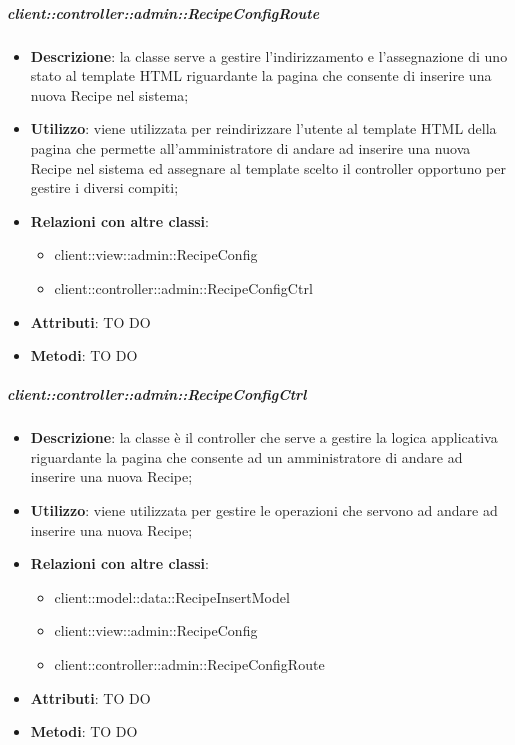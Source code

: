 		\subparagraph{client::controller::admin::RecipeConfigRoute} %
		\label{subp:bdsm_app_client_controller_admin_recipeconfigroute}
			\begin{itemize}
				\item \textbf{Descrizione}: la classe serve a gestire l'indirizzamento e l'assegnazione di uno stato al template HTML riguardante la pagina che consente di inserire una nuova Recipe nel sistema;
				\item \textbf{Utilizzo}: viene utilizzata per reindirizzare l'utente al template HTML della pagina che permette all'amministratore di andare ad inserire una nuova Recipe nel sistema ed assegnare al template scelto il controller opportuno per gestire i diversi compiti;
				\item \textbf{Relazioni con altre classi}:
					\begin{itemize}
						\item client::view::admin::RecipeConfig
						\item client::controller::admin::RecipeConfigCtrl
					\end{itemize}
				\item \textbf{Attributi}: TO DO
				\item \textbf{Metodi}: TO DO
			\end{itemize}

		\subparagraph{client::controller::admin::RecipeConfigCtrl} %
		\label{subp:bdsm_app_client_controller_admin_recipeconfigctrl}
			\begin{itemize}
				\item \textbf{Descrizione}: la classe è il controller che serve a gestire la logica applicativa riguardante la pagina che consente ad un amministratore di andare ad inserire una nuova Recipe;
				\item \textbf{Utilizzo}: viene utilizzata per gestire le operazioni che servono ad andare ad inserire una nuova Recipe;
				\item \textbf{Relazioni con altre classi}:
					\begin{itemize}
						\item client::model::data::RecipeInsertModel
						\item client::view::admin::RecipeConfig
						\item client::controller::admin::RecipeConfigRoute
					\end{itemize}
				\item \textbf{Attributi}: TO DO
				\item \textbf{Metodi}: TO DO
			\end{itemize}


